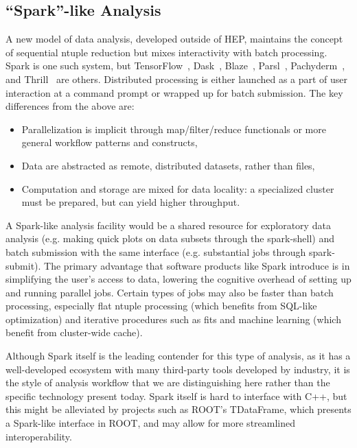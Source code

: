 \documentclass[12pt,a4paper]{article}
\begin{document}
\subsection{``Spark''-like Analysis}

A new model of data analysis, developed outside of HEP, maintains the concept of sequential ntuple reduction but mixes interactivity with batch processing. Spark is one such system, but TensorFlow~\cite{abadi2016tensorflow}, Dask~\cite{rocklin2015dask}, Blaze~\cite{wiebe2014blaze}, Parsl~\cite{babuji_yadu_2017_853492}, Pachyderm~\cite{thepachydermteam}, and Thrill~\cite{bingmann2016thrill} are others. Distributed processing is either launched as a part of user interaction at a command prompt or wrapped up for batch submission. The key differences from the above are:
\begin{itemize}
\item Parallelization is implicit through map/filter/reduce functionals or more general workflow patterns and constructs,
\item Data are abstracted as remote, distributed datasets, rather than files,
\item Computation and storage are mixed for data locality: a specialized cluster must be prepared, but can yield higher throughput.
\end{itemize}

A Spark-like analysis facility would be a shared resource for exploratory data analysis (e.g. making quick plots on data subsets through the spark-shell) and batch submission with the same interface (e.g. substantial jobs through spark-submit). The primary advantage that software products like Spark introduce is in simplifying the user's access to data, lowering the cognitive overhead of setting up and running parallel jobs. Certain types of jobs may also be faster than batch processing, especially flat ntuple processing (which benefits from SQL-like optimization) and iterative procedures such as fits and machine learning (which benefit from cluster-wide cache).

Although Spark itself is the leading contender for this type of analysis, as it has a well-developed ecosystem with many third-party tools developed by industry, it is the style of analysis workflow that we are distinguishing here rather than the specific technology present today. Spark itself is hard to interface with C++, but this might be alleviated by projects such as ROOT's TDataFrame, which presents a Spark-like interface in ROOT, and may allow for more streamlined interoperability.
\end{document}
